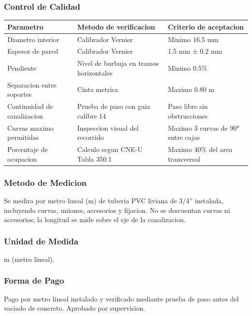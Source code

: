 \subsubsection{Control de Calidad}

\begin{longtable}{L{4.5cm} L{4.5cm} L{4.5cm}}
\toprule
\textbf{Parametro} & \textbf{Metodo de verificacion} & \textbf{Criterio de aceptacion} \\
\midrule
Diametro interior & Calibrador Vernier & Minimo 16.5 mm \\
Espesor de pared & Calibrador Vernier & 1.5 mm ± 0.2 mm \\
Pendiente & Nivel de burbuja en tramos horizontales & Minimo 0.5\% \\
Separacion entre soportes & Cinta metrica & Maximo 0.80 m \\
Continuidad de canalizacion & Prueba de paso con guia calibre 14 & Paso libre sin obstrucciones \\
Curvas maximo permitidas & Inspeccion visual del recorrido & Maximo 3 curvas de 90° entre cajas \\
Porcentaje de ocupacion & Calculo segun CNE-U Tabla 350.1 & Maximo 40\% del area transversal \\
\bottomrule
\end{longtable}

\subsubsection{Metodo de Medicion}

Se medira por metro lineal (m) de tuberia PVC liviana de 3/4'' instalada, incluyendo curvas, uniones, accesorios y fijacion. No se descuentan curvas ni accesorios; la longitud se mide sobre el eje de la canalizacion.

\subsubsection{Unidad de Medida}

m (metro lineal).

\subsubsection{Forma de Pago}

Pago por metro lineal instalado y verificado mediante prueba de paso antes del vaciado de concreto. Aprobado por supervision.

